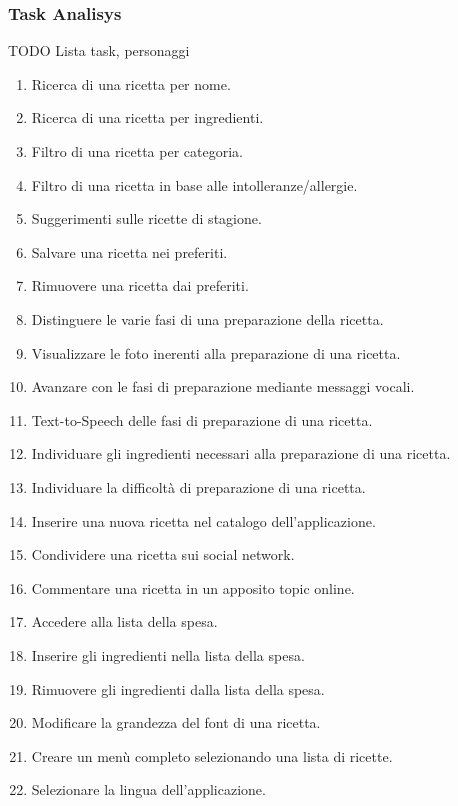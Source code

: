 \subsubsection{Task Analisys}
TODO Lista task, personaggi
\begin{enumerate}
\label{tasks}
\item Ricerca di una ricetta per nome.
\item Ricerca di una ricetta per ingredienti.
\item Filtro di una ricetta per categoria.
\item Filtro di una ricetta in base alle intolleranze/allergie.
\item Suggerimenti sulle ricette di stagione.
\item Salvare una ricetta nei preferiti.
\item Rimuovere una ricetta dai preferiti.
\item Distinguere le varie fasi di una preparazione della ricetta.
\item Visualizzare le foto inerenti alla preparazione di
una ricetta.
\item Avanzare con le fasi di preparazione mediante messaggi vocali.
\item Text-to-Speech delle fasi di preparazione di una ricetta.
\item Individuare gli ingredienti necessari alla preparazione di una
ricetta.
\item Individuare la difficoltà di preparazione di una ricetta.
\item Inserire una nuova ricetta nel catalogo dell'applicazione.
\item Condividere una ricetta sui social network.
\item Commentare una ricetta in un apposito topic online.
\item Accedere alla lista della spesa.
\item Inserire gli ingredienti nella lista della spesa.
\item Rimuovere gli ingredienti dalla lista della spesa.
\item Modificare la grandezza del font di una ricetta.
\item Creare un menù completo selezionando una lista di ricette.
\item Selezionare la lingua dell'applicazione.
\end{enumerate}
